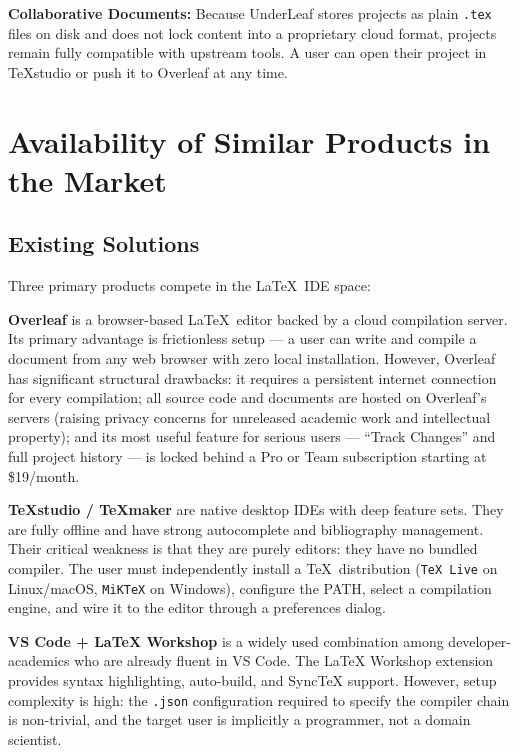 \documentclass[11pt, a4paper]{article}
\begin{document}
\textbf{Collaborative Documents:} Because UnderLeaf stores projects as plain \texttt{.tex} files on disk and does not lock content into a proprietary cloud format, projects remain fully compatible with upstream tools. A user can open their project in TeXstudio or push it to Overleaf at any time.

\section{Availability of Similar Products in the Market}

\subsection{Existing Solutions}

Three primary products compete in the \LaTeX\ IDE space:

\textbf{Overleaf} is a browser-based \LaTeX\ editor backed by a cloud compilation server. Its primary advantage is frictionless setup — a user can write and compile a document from any web browser with zero local installation. However, Overleaf has significant structural drawbacks: it requires a persistent internet connection for every compilation; all source code and documents are hosted on Overleaf's servers (raising privacy concerns for unreleased academic work and intellectual property); and its most useful feature for serious users — ``Track Changes'' and full project history — is locked behind a Pro or Team subscription starting at \$19/month.

\textbf{TeXstudio / TeXmaker} are native desktop IDEs with deep feature sets. They are fully offline and have strong autocomplete and bibliography management. Their critical weakness is that they are purely editors: they have no bundled compiler. The user must independently install a \TeX\ distribution (\texttt{TeX Live} on Linux/macOS, \texttt{MiKTeX} on Windows), configure the PATH, select a compilation engine, and wire it to the editor through a preferences dialog.

\textbf{VS Code + LaTeX Workshop} is a widely used combination among developer-academics who are already fluent in VS Code. The LaTeX Workshop extension provides syntax highlighting, auto-build, and SyncTeX support. However, setup complexity is high: the \texttt{.json} configuration required to specify the compiler chain is non-trivial, and the target user is implicitly a programmer, not a domain scientist.
\end{document}
